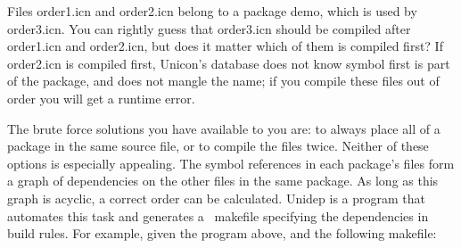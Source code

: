 
Files \textsf{order1.icn} and \textsf{order2.icn} belong to a package
demo, which is used by \textsf{order3.icn}. You can rightly guess that
order3.icn should be compiled after \textsf{order1.icn} and
\textsf{order2.icn}, but does it matter which of them is compiled
first? If \textsf{order2.icn} is compiled first,
Unicon's database does not know symbol first is part
of the package, and does not mangle the name; if you compile these
files out of order you will get a runtime error.

The brute force solutions you have available to you are: to always place
all of a package in the same source file, or to compile the files
twice. Neither of these options is especially appealing. The symbol
references in each package's files form a graph of
dependencies on the other files in the same package. As long as this
graph is acyclic, a correct order can be calculated. Unidep is a
program that automates this task and generates a \ makefile specifying
the dependencies in build rules. For example, given the program above,
and the following makefile:


